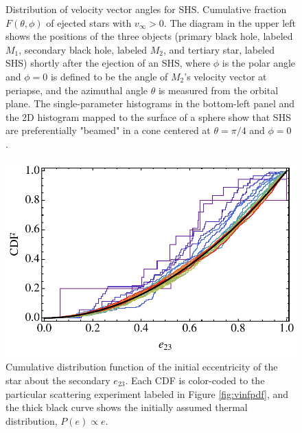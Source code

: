 \documentclass[a4paper,twocolumn]{emulateapj}
\begin{document}
\begin{figure}
\begin{minipage}[b]{0.5\linewidth}
\end{minipage}
\caption{Distribution of velocity vector angles for SHS. Cumulative fraction $F(\theta, \phi)$ of ejected stars with $v_{\infty} > 0$. The diagram in the upper left shows the positions of the three objects (primary black hole, labeled $M_{1}$, secondary black hole, labeled $M_{2}$, and tertiary star, labeled SHS) shortly after the ejection of an SHS, where $\phi$ is the polar angle and $\phi = 0$ is defined to be the angle of $M_{2}$'s velocity vector at periapse, and the azimuthal angle $\theta$ is measured from the orbital plane. The single-parameter histograms in the bottom-left panel and the 2D histogram mapped to the surface of a sphere show that SHS are preferentially "beamed" in a cone centered at $\theta = \pi/4$ and $\phi = 0$ \citep[see][]{Sesana:2007a,Zier:2001a}.}
\label{fig:ejangles}
\end{figure}

\begin{figure}
\centering\includegraphics[width=0.9\linewidth,clip=true]{eCDF}
\caption{Cumulative distribution function of the initial eccentricity of the star about the secondary $e_{23}$. Each CDF is color-coded to the particular scattering experiment labeled in Figure \ref{fig:vinfpdf}, and the thick black curve shows the initially assumed thermal distribution, $P(e) \propto e$.}
\label{fig:ecdf}
\end{figure}
\end{document}
